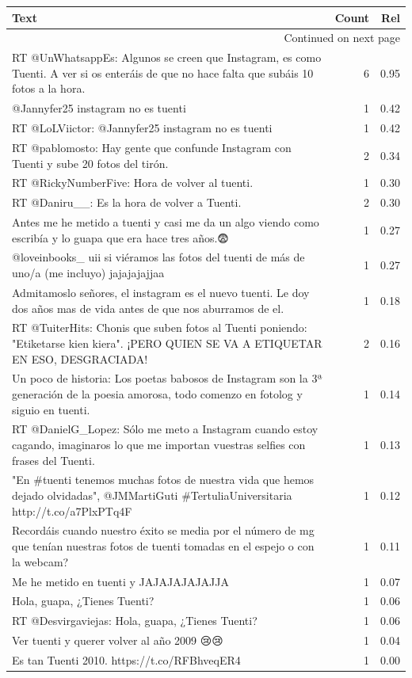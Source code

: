 \begin{longtable}{p{12.5cm}rr}
\toprule
Text & Count & Rel \\
\midrule
\endhead
\midrule
\multicolumn{3}{r}{{Continued on next page}} \\
\midrule
\endfoot

\bottomrule
\endlastfoot
RT @UnWhatsappEs: Algunos se creen que Instagram, es como Tuenti. A ver si os enteráis de que no hace falta que subáis 10 fotos a la hora. & 6 & 0.95 \\
@Jannyfer25 instagram no es tuenti & 1 & 0.42 \\
RT @LoLViictor: @Jannyfer25 instagram no es tuenti & 1 & 0.42 \\
RT @pablomosto: Hay gente que confunde Instagram con Tuenti y sube 20 fotos del tirón. & 2 & 0.34 \\
RT @RickyNumberFive: Hora de volver al tuenti. & 1 & 0.30 \\
RT @Daniru\_\_: Es la hora de volver a Tuenti. & 2 & 0.30 \\
Antes me he metido a tuenti y casi me da un algo viendo como escribía y lo guapa que era hace tres años.😨 & 1 & 0.27 \\
@loveinbooks\_ uii si viéramos las fotos del tuenti de más de uno/a (me incluyo) jajajajajjaa & 1 & 0.27 \\
Admitamoslo señores, el instagram es el nuevo tuenti. Le doy dos años mas de vida antes de que nos aburramos de el. & 1 & 0.18 \\
RT @TuiterHits: Chonis que suben fotos al Tuenti poniendo: "Etiketarse kien kiera". ¡PERO QUIEN SE VA A ETIQUETAR EN ESO, DESGRACIADA! & 2 & 0.16 \\
Un poco de historia: Los poetas babosos de Instagram son la 3ª generación de la poesia amorosa, todo comenzo en fotolog y siguio en tuenti. & 1 & 0.14 \\
RT @DanielG\_Lopez: Sólo me meto a Instagram cuando estoy cagando, imaginaros lo que me importan vuestras selfies con frases del Tuenti. & 1 & 0.13 \\
"En \#tuenti tenemos muchas fotos de nuestra vida que hemos dejado olvidadas", @JMMartiGuti \#TertuliaUniversitaria http://t.co/a7PlxPTq4F & 1 & 0.12 \\
Recordáis cuando nuestro éxito se media por el número de mg que tenían nuestras fotos de tuenti tomadas en el espejo  o con la webcam? & 1 & 0.11 \\
Me he metido en tuenti y JAJAJAJAJAJJA & 1 & 0.07 \\
Hola, guapa, ¿Tienes Tuenti? & 1 & 0.06 \\
RT @Desvirgaviejas: Hola, guapa, ¿Tienes Tuenti? & 1 & 0.06 \\
Ver tuenti y querer volver al año 2009 😢😢 & 1 & 0.04 \\
Es tan Tuenti 2010. https://t.co/RFBhveqER4 & 1 & 0.00 \\

\end{longtable}
\clearpage

